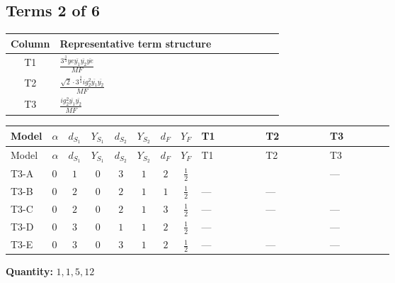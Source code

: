 \documentclass[8pt]{article}
\begin{document}
\begin{landscape}
\subsection*{Terms 2 of 6}
\begin{center}
\begin{tabular}{@{}c >{\raggedright\arraybackslash}p{0.82\linewidth}@{}}
\toprule
Column & Representative term structure \\
\midrule
T1 & \(\displaystyle \frac{3^{\frac{3}{4}} ye \overline{y_{1}} \overline{y_{2}} \overline{ye}}{MF}\) \\
\midrule
T2 & \(\displaystyle \frac{\sqrt{2} \cdot 3^{\frac{3}{4}} i g_{2}^{2} \overline{y_{1}} \overline{y_{2}}}{MF}\) \\
\midrule
T3 & \(\displaystyle \frac{i g_{2}^{2} \overline{y_{1}} \overline{y_{2}}}{MF}\) \\
\midrule
\bottomrule
\end{tabular}
\end{center}
\smallskip
\tiny
\begin{longtable}{@{}llcccccc >{\raggedright\arraybackslash}p{0.21\linewidth} >{\raggedright\arraybackslash}p{0.21\linewidth} >{\raggedright\arraybackslash}p{0.21\linewidth}@{}}
\toprule
Model & $\alpha$ & $d_{S_1}$ & $Y_{S_1}$ & $d_{S_2}$ & $Y_{S_2}$ & $d_F$ & $Y_F$ & T1 & T2 & T3 \\
\midrule
\endfirsthead
\toprule
Model & $\alpha$ & $d_{S_1}$ & $Y_{S_1}$ & $d_{S_2}$ & $Y_{S_2}$ & $d_F$ & $Y_F$ & T1 & T2 & T3 \\
\midrule
\endhead
T3-A & $0$ & $1$ & $0$ & $3$ & $1$ & $2$ & $\frac{1}{2}$ & \scriptsize\adjustbox{max width=\linewidth}{$\begin{gathered} - \frac{3^{\frac{3}{4}} ye \overline{y_{1}} \overline{y_{2}} \overline{ye}}{12 MF}\end{gathered}$} & \scriptsize\adjustbox{max width=\linewidth}{$\begin{gathered} \frac{\sqrt{2} \cdot 3^{\frac{3}{4}} i g_{2}^{2} \overline{y_{1}} \overline{y_{2}}}{3 MF}\end{gathered}$} & --- \\
\midrule
T3-B & $0$ & $2$ & $0$ & $2$ & $1$ & $1$ & $\frac{1}{2}$ & --- & --- & \scriptsize\adjustbox{max width=\linewidth}{$\begin{gathered} - \frac{3 i g_{2}^{2} \overline{y_{1}} \overline{y_{2}}}{4 MF}\end{gathered}$} \\
\midrule
T3-C & $0$ & $2$ & $0$ & $2$ & $1$ & $3$ & $\frac{1}{2}$ & --- & --- & --- \\
\midrule
T3-D & $0$ & $3$ & $0$ & $1$ & $1$ & $2$ & $\frac{1}{2}$ & --- & \scriptsize\adjustbox{max width=\linewidth}{$\begin{gathered} - \frac{\sqrt{2} \cdot 3^{\frac{3}{4}} i g_{2}^{2} \overline{y_{1}} \overline{y_{2}}}{3 MF}\end{gathered}$} & --- \\
\midrule
T3-E & $0$ & $3$ & $0$ & $3$ & $1$ & $2$ & $\frac{1}{2}$ & --- & --- & --- \\
\midrule
\bottomrule
\end{longtable}
\clearpage
\noindent\textbf{Quantity: }$\mathrm{1,1,5,12}$\par\smallskip

\end{landscape}
\end{document}
